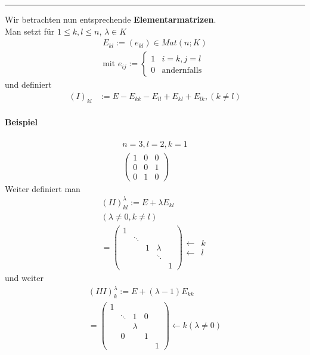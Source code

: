\documentclass[11pt]{report}
\newcommand*\f[1] {\textbf{#1}}
\begin{document}
\vspace*{0.2cm}\rule{\linewidth}{0.3mm}\vspace{0.2cm}
Wir betrachten nun entsprechende \f{Elementarmatrizen}. \\
Man setzt für $1 \leq k, l \leq n$, $\lambda \in K$
\begin{align}
E_{kl} := (e_{kl}) \in Mat(n;K) \\
\text{mit } e_{ij} := \left\{ \begin{matrix} 1 & i=k, j=l \\ 0 & \text{andernfalls}\end{matrix} \right.
\end{align}
und definiert
\begin{align}
(I)_{kl} &:= E-E_{kk} - E_{ll} + E_{kl} + E_{lk}, (k \neq l)
\end{align}

\paragraph{Beispiel}
\begin{align}
n = 3, l = 2, k = 1 \\
\begin{pmatrix} 1 & 0 & 0 \\ 0 & 0 & 1 \\ 0 & 1 & 0 \end{pmatrix}
\end{align}
Weiter definiert man
\begin{align}
(II)^{\lambda}_{kl} := E + \lambda E_{kl} \\
(\lambda \neq 0, k \neq l) \\
= \begin{pmatrix} 1 & & & & \\ 
		    & \ddots & & & \\ 
		    & & 1 & \lambda & \\ 
		    & & & \ddots & \\ 
		    & & & & 1 
\end{pmatrix}
\begin{matrix} \leftarrow & k \\ \leftarrow & l \end{matrix}
\end{align}
und weiter
\begin{align}
(III)^{\lambda}_{k} := E + (\lambda-1) E_{kk} \\
= \begin{pmatrix} 1 & & & & \\ 
		  & \ddots & 1 & 0 & \\ 
		  & & \lambda & &  \\ 
		  & 0 & & 1 & \\ 
		  & & & & 1 
\end{pmatrix} \leftarrow k (\lambda \neq 0)
\end{align}
\end{document}
